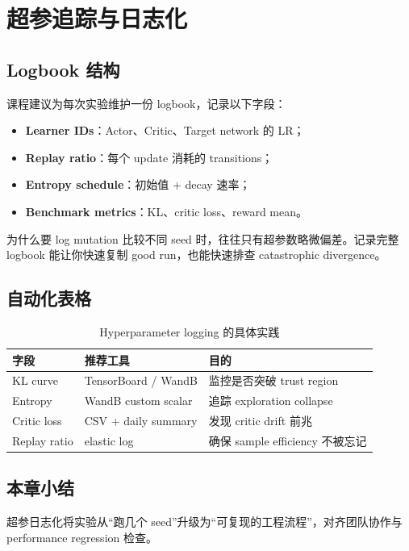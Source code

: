 \section{超参追踪与日志化}

\subsection{Logbook 结构}

课程建议为每次实验维护一份 logbook，记录以下字段：

\begin{itemize}
    \item \textbf{Learner IDs}：Actor、Critic、Target network 的 LR；
    \item \textbf{Replay ratio}：每个 update 消耗的 transitions；
    \item \textbf{Entropy schedule}：初始值 + decay 速率；
    \item \textbf{Benchmark metrics}：KL、critic loss、reward mean。
\end{itemize}

\begin{importantbox}{为什么要 log mutation}
比较不同 seed 时，往往只有超参数略微偏差。记录完整 logbook 能让你快速复制 good run，也能快速排查 catastrophic divergence。
\end{importantbox}

\subsection{自动化表格}

\begin{table}[H]
\centering
\begin{tabular}{p{}p{}p{}}
\toprule
字段 & 推荐工具 & 目的 \\
\midrule
KL curve & TensorBoard / WandB & 监控是否突破 trust region \\
Entropy & WandB custom scalar & 追踪 exploration collapse \\
Critic loss & CSV + daily summary & 发现 critic drift 前兆 \\
Replay ratio & elastic log & 确保 sample efficiency 不被忘记 \\
\bottomrule
\end{tabular}
\caption{Hyperparameter logging 的具体实践}
\end{table}

\subsection{本章小结}

超参日志化将实验从“跑几个 seed”升级为“可复现的工程流程”，对齐团队协作与 performance regression 检查。

